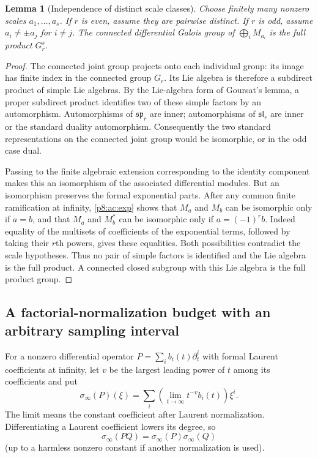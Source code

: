 \documentclass[11pt,a4paper]{article}
\newtheorem{lemma}[theorem]{Lemma}
\theoremstyle{definition}
\theoremstyle{remark}
\numberwithin{equation}{section}
\begin{document}
\begin{lemma}[Independence of distinct scale classes]
\label{p8:ac:independence}
Choose finitely many nonzero scales $a_1,\ldots,a_s$.
If $r$ is even, assume they are pairwise distinct. If $r$ is odd,
assume $a_i\ne\pm a_j$ for $i\ne j$. The connected differential
Galois group of $\bigoplus_i M_{a_i}$ is the full product
$G_r^s$.
\end{lemma}
\begin{proof}
The connected joint group projects onto each individual group:
its image has finite index in the connected group $G_r$.
Its Lie algebra is therefore a subdirect product of simple Lie
algebras. By the Lie-algebra form of Goursat's lemma, a proper
subdirect product identifies two of these simple factors by an
automorphism. Automorphisms of $\mathfrak{sp}_r$ are inner;
automorphisms of $\mathfrak{sl}_r$ are inner or the standard duality
automorphism. Consequently the two standard representations on the
connected joint group would be isomorphic, or in the odd case dual.

Passing to the finite algebraic extension corresponding to the
identity component makes this an isomorphism of the associated
differential modules. But an isomorphism preserves the formal
exponential parts. After any common finite ramification at infinity,
\eqref{p8:ac:exp} shows that $M_a$ and $M_b$ can be isomorphic only if
$a=b$, and that $M_a$ and $M_b^*$ can be isomorphic only if
$a=(-1)^r b$. Indeed equality of the multisets of coefficients of
the exponential terms, followed by taking their $r$th powers, gives
these equalities. Both possibilities contradict the scale hypotheses.
Thus no pair of simple factors is identified and the Lie algebra is
the full product. A connected closed subgroup with this Lie algebra
is the full product group.
\end{proof}


\subsection{A factorial-normalization budget with an arbitrary sampling interval}

For a nonzero differential operator $P=\sum_i b_i(t)\partial_t^i$
with formal Laurent coefficients at infinity, let $v$ be the largest
leading power of $t$ among its coefficients and put
\[
 \sigma_\infty(P)(\xi)
 =\sum_i\left(\lim_{t\to\infty}t^{-v}b_i(t)\right)\xi^i.
\]
The limit means the constant coefficient after Laurent normalization.
Differentiating a Laurent coefficient lowers its degree, so
\begin{equation}\label{p8:ac:symbol-product}
 \sigma_\infty(PQ)=\sigma_\infty(P)\sigma_\infty(Q)
\end{equation}
(up to a harmless nonzero constant if another normalization is used).
\end{document}

